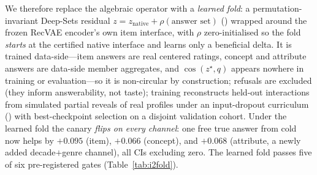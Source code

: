 \documentclass[11pt]{article}
\begin{document}
We therefore replace the algebraic operator with a \emph{learned fold}: a permutation-invariant Deep-Sets
residual $z = z_{\mathrm{native}} + \rho(\text{answer set})$ (\cite{zaheer17,eddi19}) wrapped around the
frozen RecVAE encoder's own item interface, with $\rho$ zero-initialised so the fold \emph{starts} at the
certified native interface and learns only a beneficial delta. It is trained data-side---item answers are
real centered ratings, concept and attribute answers are data-side member aggregates, and $\cos(z^\star,q)$
appears nowhere in training or evaluation---so it is non-circular by construction; refusals are excluded
(they inform answerability, not taste); training reconstructs held-out interactions from simulated partial
reveals of real profiles under an input-dropout curriculum (\cite{dropoutnet17}) with best-checkpoint
selection on a disjoint validation cohort. Under the learned fold the canary \emph{flips on every channel}:
one free true answer from cold now helps by $+0.095$ (item), $+0.066$ (concept), and $+0.068$ (attribute,
a newly added decade$+$genre channel), all CIs excluding zero. The learned fold passes five of six
pre-registered gates (Table~\ref{tab:i2fold}).
\end{document}
